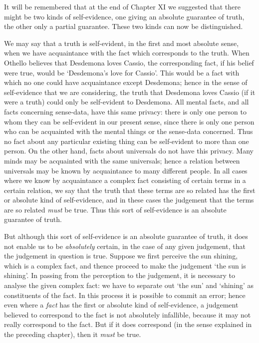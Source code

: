 \documentclass[oneside,letterpaper,12pt]{book}
\begin{document}
It will be remembered that at the end of Chapter XI we suggested that
there might be two kinds of self-evidence, one giving an absolute
guarantee of truth, the other only a partial guarantee. These two kinds
can now be distinguished.

We may say that a truth is self-evident, in the first and most absolute
sense, when we have acquaintance with the fact which corresponds to the
truth. \label{selfevidence} When Othello believes that Desdemona loves Cassio, the
corresponding fact, if his belief were true, would be
`Desdemona's love for
Cassio'. This would be a fact with which no one could
have acquaintance except Desdemona; hence in the sense of self-evidence
that we are considering, the truth that Desdemona loves Cassio (if it
were a truth) could only be self-evident to Desdemona. All mental facts,
and all facts concerning sense-data, have this same privacy: there is
only one person to whom they can be self-evident in our present sense,
since there is only one person who can be acquainted with the mental
things or the sense-data concerned. Thus no fact about any particular
existing thing can be self-evident to more than one person. On the other
hand, facts about universals do not have this privacy. Many minds may be
acquainted with the same universals; hence a relation between universals
may be known by acquaintance to many different people. In all cases
where we know by acquaintance a complex fact consisting of certain terms
in a certain relation, we say that the truth that these terms are so
related has the first or absolute kind of self-evidence, and in these
cases the judgement that the terms are so related \emph{must} be true.
Thus this sort of self-evidence is an absolute guarantee of truth. \label{infallible}

But although this sort of self-evidence is an absolute guarantee of
truth, it does not enable us to be \emph{absolutely} certain, in the
case of any given judgement, that the judgement in question is true. \label{fallible}
Suppose we first perceive the sun shining, which is a complex fact, and
thence proceed to make the judgement `the sun is
shining'. In passing from the perception to the
judgement, it is necessary to analyse the given complex fact: we have to
separate out `the sun' and
`shining' as constituents of the fact.
In this process it is possible to commit an error; hence even where a
\emph{fact} has the first or absolute kind of self-evidence, a judgement
believed to correspond to the fact is not absolutely infallible, because
it may not really correspond to the fact. But if it does correspond (in
the sense explained in the preceding chapter), then it \emph{must} be
true.
\end{document}
